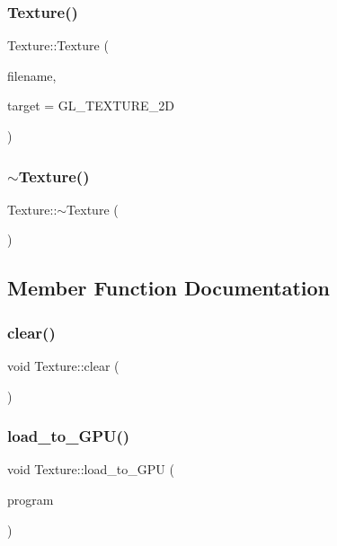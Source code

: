 \subsubsection{\texorpdfstring{Texture()}{Texture()}}
{\footnotesize\ttfamily Texture\+::\+Texture (\begin{DoxyParamCaption}\item[{const char $\ast$}]{filename,  }\item[{G\+Luint}]{target = {\ttfamily GL\+\_\+TEXTURE\+\_\+2D} }\end{DoxyParamCaption})}

\mbox{\label{classTexture_a09c4bcb7462f64c1d20fa69dba3cee8a}} 
\subsubsection{\texorpdfstring{$\sim$\+Texture()}{~Texture()}}
{\footnotesize\ttfamily Texture\+::$\sim$\+Texture (\begin{DoxyParamCaption}{ }\end{DoxyParamCaption})}



\subsection{Member Function Documentation}
\mbox{\label{classTexture_ae02304cd1a555cd43b0af49162102a1a}} 
\subsubsection{\texorpdfstring{clear()}{clear()}}
{\footnotesize\ttfamily void Texture\+::clear (\begin{DoxyParamCaption}{ }\end{DoxyParamCaption})}

\mbox{\label{classTexture_a9db65830c1a20ad231183c498f711337}} 
\subsubsection{\texorpdfstring{load\+\_\+to\+\_\+\+G\+P\+U()}{load\_to\_GPU()}}
{\footnotesize\ttfamily void Texture\+::load\+\_\+to\+\_\+\+G\+PU (\begin{DoxyParamCaption}\item[{G\+Luint}]{program }\end{DoxyParamCaption})}



